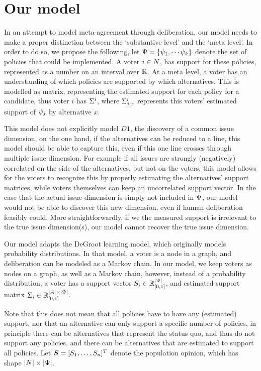 \section{Our model} \label{sec: main model}

In an attempt to model meta-agreement through deliberation, our model needs to
make a proper distinction between the `substantive level' and the `meta level'.
In order to do so, we propose the following, let \(\Psi = \{\psi_{1},
\cdots \psi_{k}\}\) denote the set of policies that could be implemented. A
voter $i \in N$, has support for these policies, represented as a number
on an interval over $\mathbb{R}$. At a meta level, a voter has an understanding of
which policies are supported by which alternatives. This is modelled as matrix,
representing the estimated support for each policy for a candidate, thus voter
$i$ has $\Sigma^i$, where $\Sigma^i_{j, x}$ represents this voters'
estimated support of $\psi_j$ by alternative $x$.

This model does not explicitly model $D1$, the discovery of a common issue
dimension, on the one hand, if the alternatives can be reduced to a line, this
model should be able to capture this, even if this one line crosses through
multiple issue dimension. For example if all issues are strongly (negatively)
correlated on the side of the alternatives, but not on the voters, this model
allows for the voters to recognize this by properly estimating the
alternatives' support matrices, while voters themselves can keep an
uncorrelated support vector. In the case that the actual issue dimension is
simply not included in $\Psi$, our model would not be able to discover
this new dimension, even if human deliberation feasibly could. More
straightforwardly, if we the measured support is irrelevant to the true issue
dimension(s), our model cannot recover the true issue dimension.

Our model adapts the DeGroot learning model, which
originally models probability distributions. In that model, a voter is
a node in a graph, and deliberation can be modeled as a Markov chain. In our
model, we keep voters as nodes on a graph, as well as a Markov chain, however,
instead of a probability distribution, a voter has a support vector $S_i \in
	\mathbb{R}^{|\Psi|}_{[0,1]}$, and estimated support matrix $\Sigma_i\in
	\mathbb{R}^{|A| \times |\Psi|}_{[0,1]}$.

Note that this does not mean that all policies have to have any (estimated)
support, nor that an alternative can only support a specific number of
policies, in principle there can be alternatives that represent the status quo,
and thus do not support any policies, and there can be alternatives that are
estimated to support all policies.  Let $\boldsymbol{S}= [S_1, \dots,
	S_{n}]^{T}$ denote the population opinion, which has shape \(|N|
\times |\Psi|\).

